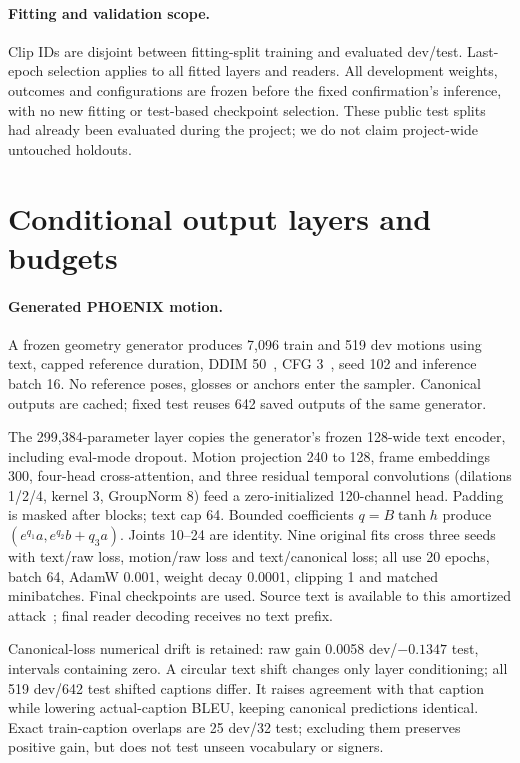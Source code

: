 \documentclass[10pt,twocolumn,letterpaper]{article}
\begin{document}
\paragraph{Fitting and validation scope.}
Clip IDs are disjoint between fitting-split training and evaluated dev/test. Last-epoch selection applies to all fitted layers and readers. All development weights, outcomes and configurations are frozen before the fixed confirmation's inference, with no new fitting or test-based checkpoint selection. These public test splits had already been evaluated during the project; we do not claim project-wide untouched holdouts.


\section{Conditional output layers and budgets}

\paragraph{Generated PHOENIX motion.}
A frozen geometry generator produces 7,096 train and 519 dev motions using text, capped reference duration, DDIM 50~\cite{song2021}, CFG 3~\cite{ho2022}, seed 102 and inference batch 16. No reference poses, glosses or anchors enter the sampler. Canonical outputs are cached; fixed test reuses 642 saved outputs of the same generator.

The 299,384-parameter layer copies the generator's frozen 128-wide text encoder, including eval-mode dropout. Motion projection 240 to 128, frame embeddings 300, four-head cross-attention, and three residual temporal convolutions (dilations 1/2/4, kernel 3, GroupNorm 8) feed a zero-initialized 120-channel head. Padding is masked after blocks; text cap 64. Bounded coefficients $q=B\tanh h$ produce $(e^{q_1}a,e^{q_2}b+q_3 a)$. Joints 10--24 are identity. Nine original fits cross three seeds with text/raw loss, motion/raw loss and text/canonical loss; all use 20 epochs, batch 64, AdamW 0.001, weight decay 0.0001, clipping 1 and matched minibatches. Final checkpoints are used. Source text is available to this amortized attack~\cite{gap2018,atn2018}; final reader decoding receives no text prefix.

Canonical-loss numerical drift is retained: raw gain 0.0058 dev/$-0.1347$ test, intervals containing zero. A circular text shift changes only layer conditioning; all 519 dev/642 test shifted captions differ. It raises agreement with that caption while lowering actual-caption BLEU, keeping canonical predictions identical. Exact train-caption overlaps are 25 dev/32 test; excluding them preserves positive gain, but does not test unseen vocabulary or signers.
\end{document}
